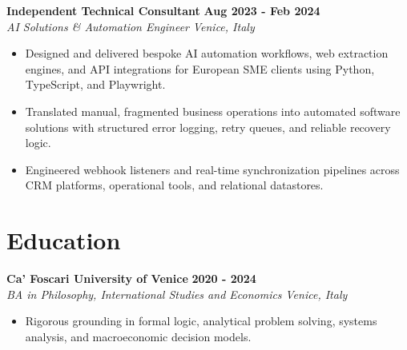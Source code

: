 \documentclass[10pt,a4paper]{article}
\newcommand{\role}[4]{%
  \textbf{#1} \hfill \textbf{#2}\\[1pt]%
  \textit{#3} \hfill \textit{#4}\\[2pt]%
}
\begin{document}
\role{Independent Technical Consultant}{Aug 2023 - Feb 2024}{AI Solutions \& Automation Engineer}{Venice, Italy}
\begin{itemize}
  \item Designed and delivered bespoke AI automation workflows, web extraction engines, and API integrations for European SME clients using Python, TypeScript, and Playwright.
  \item Translated manual, fragmented business operations into automated software solutions with structured error logging, retry queues, and reliable recovery logic.
  \item Engineered webhook listeners and real-time synchronization pipelines across CRM platforms, operational tools, and relational datastores.
\end{itemize}

\section{Education}
\role{Ca' Foscari University of Venice}{2020 - 2024}{BA in Philosophy, International Studies and Economics}{Venice, Italy}
\begin{itemize}
  \item Rigorous grounding in formal logic, analytical problem solving, systems analysis, and macroeconomic decision models.
\end{itemize}
\end{document}
